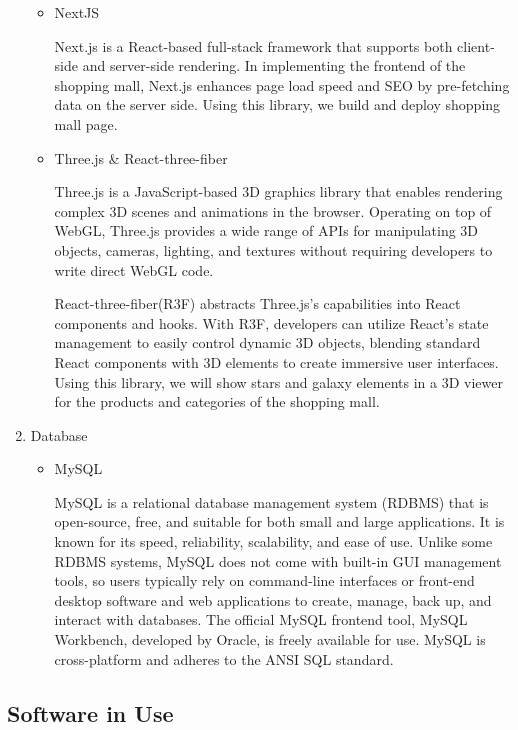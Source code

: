 \documentclass[conference]{IEEEtran}
\begin{document}
\begin{enumerate}
\begin{itemize}
\item NextJS 

Next.js is a React-based full-stack framework that supports both client-side and server-side rendering. In implementing the frontend of the shopping mall, Next.js enhances page load speed and SEO by pre-fetching data on the server side. Using this library, we build and deploy shopping mall page.

\item Three.js \& React-three-fiber

Three.js is a JavaScript-based 3D graphics library that enables rendering complex 3D scenes and animations in the browser. Operating on top of WebGL, Three.js provides a wide range of APIs for manipulating 3D objects, cameras, lighting, and textures without requiring developers to write direct WebGL code.

React-three-fiber(R3F) abstracts Three.js’s capabilities into React components and hooks. With R3F, developers can utilize React’s state management to easily control dynamic 3D objects, blending standard React components with 3D elements to create immersive user interfaces. Using this library, we will show stars and galaxy elements in a 3D viewer for the products and categories of the shopping mall. 

\end{itemize}

\item Database

\begin{itemize}
\setlength{\parindent}{2ex}
\setlength{\parskip}{0.5em}
\item MySQL

MySQL is a relational database management system (RDBMS) that is open-source, free, and suitable for both small and large applications. It is known for its speed, reliability, scalability, and ease of use. Unlike some RDBMS systems, MySQL does not come with built-in GUI management tools, so users typically rely on command-line interfaces or front-end desktop software and web applications to create, manage, back up, and interact with databases. The official MySQL frontend tool, MySQL Workbench, developed by Oracle, is freely available for use. MySQL is cross-platform and adheres to the ANSI SQL standard.

\end{itemize}

\end{enumerate}

\subsection{Software in Use}
\end{document}
